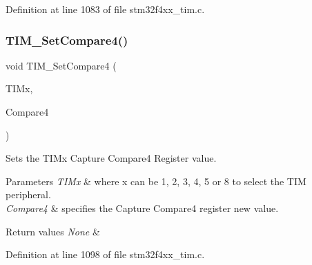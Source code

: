 Definition at line 1083 of file stm32f4xx\+\_\+tim.\+c.

\mbox{\label{group___t_i_m___group2_ga99ba6c2afa87a239c9d32a49762b4245}} 
\subsubsection{\texorpdfstring{T\+I\+M\+\_\+\+Set\+Compare4()}{TIM\_SetCompare4()}}
{\footnotesize\ttfamily void T\+I\+M\+\_\+\+Set\+Compare4 (\begin{DoxyParamCaption}\item[{\hyperlink{struct_t_i_m___type_def}{T\+I\+M\+\_\+\+Type\+Def} $\ast$}]{T\+I\+Mx,  }\item[{uint32\+\_\+t}]{Compare4 }\end{DoxyParamCaption})}



Sets the T\+I\+Mx Capture Compare4 Register value. 


\begin{DoxyParams}{Parameters}
{\em T\+I\+Mx} & where x can be 1, 2, 3, 4, 5 or 8 to select the T\+IM peripheral. \\
\hline
{\em Compare4} & specifies the Capture Compare4 register new value. \\
\hline
\end{DoxyParams}

\begin{DoxyRetVals}{Return values}
{\em None} & \\
\hline
\end{DoxyRetVals}


Definition at line 1098 of file stm32f4xx\+\_\+tim.\+c.

